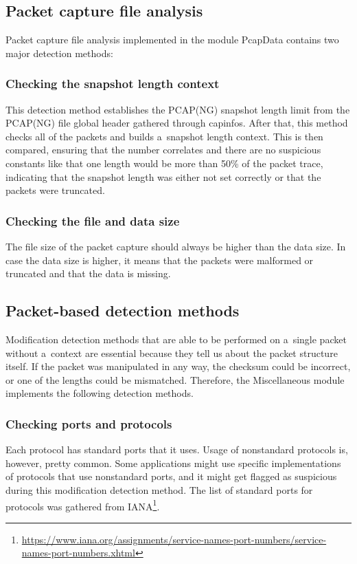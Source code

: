 \documentclass[
  printed,     %
  color,       %
  oneside,     %
  nosansbold,  %
  nocolorbold, %
  nolof,         %
  nolot,         %
]{fithesis4}
\begin{document}
\subsection{Packet capture file analysis}

Packet capture file analysis implemented in the module PcapData contains two major detection methods:

\subsubsection{Checking the snapshot length context}

This detection method establishes the PCAP(NG) snapshot length limit from the PCAP(NG) file global header gathered through capinfos. After that, this method checks all of the packets and builds a~snapshot length context. This is then compared, ensuring that the number correlates and there are no suspicious constants like that one length would be more than 50\% of the packet trace, indicating that the snapshot length was either not set correctly or that the packets were truncated.

\subsubsection{Checking the file and data size}

The file size of the packet capture should always be higher than the data size. In case the data size is higher, it means that the packets were malformed or truncated and that the data is missing.

\subsection{Packet-based detection methods}

Modification detection methods that are able to be performed on a~single packet without a~context are essential because they tell us about the packet structure itself. If the packet was manipulated in any way, the checksum could be incorrect, or one of the lengths could be mismatched. Therefore, the Miscellaneous module implements the following detection methods.

\subsubsection{Checking ports and protocols}

Each protocol has standard ports that it uses. Usage of nonstandard protocols is, however, pretty common. Some applications might use specific implementations of protocols that use nonstandard ports, and it might get flagged as suspicious during this modification detection method. The list of standard ports for protocols was gathered from IANA\footnote{\url{https://www.iana.org/assignments/service-names-port-numbers/service-names-port-numbers.xhtml}}.
\end{document}
